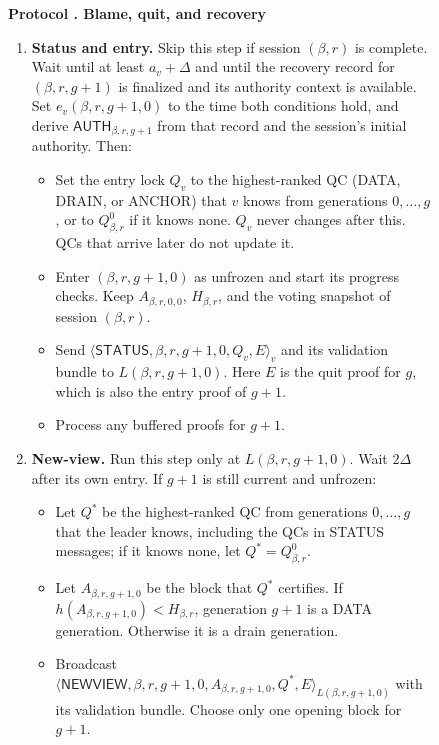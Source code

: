 \documentclass[11pt,a4paper]{article}
\newcommand{\RR}[1]{{\color{rrRed}#1}}
\newcommand{\tagg}[1]{\ensuremath{\mathsf{#1}}}
\newcounter{protocol}
\newenvironment{protocol}[3][htbp]{\begin{figure}[#1]\refstepcounter{protocol}\label{#2}
\begin{mdframed}[linewidth=.6pt,skipabove=0pt,skipbelow=0pt,
innertopmargin=7pt,innerbottommargin=7pt]\small
\textbf{Protocol \theprotocol. #3}\par\smallskip}{\end{mdframed}\end{figure}}
\begin{document}
\begin{protocol}{alg:recovery}{Blame, quit, and recovery}
\begin{enumerate}[label=\textbf{\arabic*)},itemsep=3pt]
\item \textbf{Status and entry.} \RR{Skip this step if session $(\beta,r)$ is
complete.} \RR{Wait until at least $a_v+\Delta$ and until
the recovery record for $(\beta,r,g+1)$ is finalized and its authority
context is available. Set $e_v(\beta,r,g+1,0)$ to the time both conditions
hold, and derive $\tagg{AUTH}_{\beta,r,g+1}$ from that record and the
session's initial authority.} Then:
 \begin{itemize}
 \item Set the entry lock $Q_v$ to the highest-ranked QC
       (DATA\RR{, DRAIN,} or ANCHOR) that $v$ knows from generations
       $0,\ldots,g$\RR{, or to $Q_{\beta,r}^0$ if it knows none}.
       $Q_v$ never changes after this. QCs that arrive later do not
       update it.
 \item Enter $(\beta,r,g+1,0)$ as unfrozen and start its progress checks.
       \RR{Keep $A_{\beta,r,0,0}$, $H_{\beta,r}$, and the voting snapshot of session $(\beta,r)$.}
 \item Send $\langle\tagg{STATUS},\beta,r,g+1,0,Q_v,E\rangle_v$ and its
       validation bundle to $L(\beta,r,g+1,0)$. Here $E$ is the quit proof for
       $g$, which is also the entry proof of $g+1$.
 \item Process any buffered proofs for $g+1$.
 \end{itemize}

\item \textbf{New-view.} Run this step only at $L(\beta,r,g+1,0)$. Wait $2\Delta$
after its own entry. If $g+1$ is still current and unfrozen:
 \begin{itemize}
 \item Let $Q^*$ be the highest-ranked QC from generations $0,\ldots,g$
       that the leader knows, including the QCs in STATUS
       messages\RR{; if it knows none, let $Q^*=Q_{\beta,r}^0$}.
 \item Let $A_{\beta,r,g+1,0}$ be the block that $Q^*$ certifies. \RR{If
       $h(A_{\beta,r,g+1,0})<H_{\beta,r}$, generation $g+1$ is a DATA generation.
       Otherwise it is a drain generation.}
 \item Broadcast
       $\langle\tagg{NEWVIEW},\beta,r,g+1,0,A_{\beta,r,g+1,0},Q^*,E\rangle_{L(\beta,r,g+1,0)}$
       with its validation bundle. Choose only one opening block for
       $g+1$.
 \end{itemize}


\end{enumerate}
\end{protocol}
\end{document}
